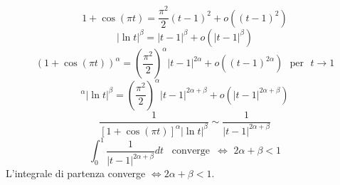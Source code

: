 \documentclass{article}
\begin{document}
\begin{equation*}
    1+\cos(\pi t)= \frac{\pi^2}{2} (t-1)^2+o((t-1)^2)
\end{equation*}
\begin{equation*}
    |\ln t|^\beta = |t-1|^\beta +o(|t-1|^\beta)
\end{equation*}
\begin{equation*}
    (1+\cos(\pi t))^\alpha = \left( \frac{\pi^2}{2} \right)^\alpha |t-1|^{2\alpha} + o((t-1)^{2\alpha})\,\,\,\, \text{per} \,\,\,\, t \rightarrow 1
\end{equation*}
\begin{equation*}
    [1+\cos(\pi t)]^\alpha |\ln t|^\beta = \left(\frac{\pi^2}{2}\right)^\alpha |t-1|^{2\alpha+\beta} +o(|t-1|^{2\alpha+\beta})
\end{equation*}
\begin{equation*}
    \frac{1}{[1+\cos(\pi t)]^\alpha |\ln t|^\beta} \sim \frac{1}{|t-1|^{2\alpha+\beta}}
\end{equation*}
\begin{equation*}
    \int_{0}^{1} \frac{1}{|t-1|^{2\alpha+\beta}} dt \,\,\,\,\, \text{converge} \,\,\, \Leftrightarrow \,\, 2\alpha+\beta <1
\end{equation*}
L'integrale di partenza converge $\Leftrightarrow 2\alpha +\beta < 1$.
\end{document}
